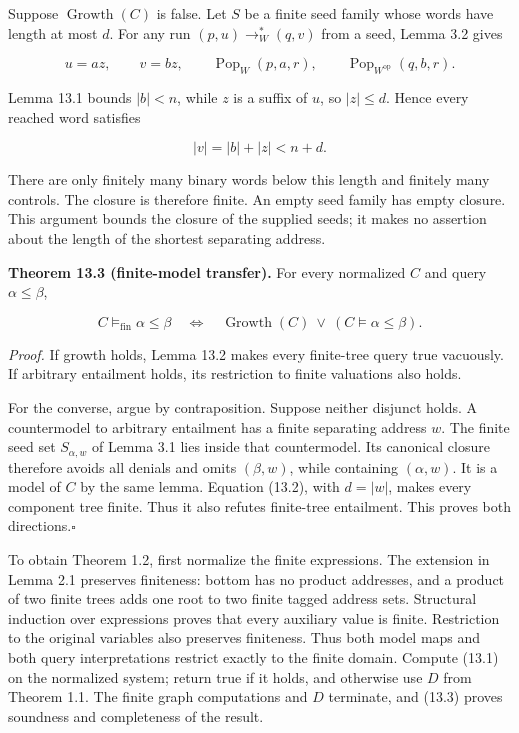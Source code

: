 \documentclass[
  11pt,
  a4paper,
]{article}
\begin{document}
Suppose \(\operatorname{Growth}(C)\) is false. Let \(S\) be a finite
seed family whose words have length at most \(d\). For any run
\((p,u)\to_W^*(q,v)\) from a seed, Lemma 3.2 gives

\[u=az,\qquad v=bz,\qquad
\operatorname{Pop}_W(p,a,r),\qquad
\operatorname{Pop}_{W^{\mathrm{op}}}(q,b,r).\]

Lemma 13.1 bounds \(|b|<n\), while \(z\) is a suffix of \(u\), so
\(|z|\le d\). Hence every reached word satisfies

\[|v|=|b|+|z|<n+d.\tag{13.2}\]

There are only finitely many binary words below this length and finitely
many controls. The closure is therefore finite. An empty seed family has
empty closure. This argument bounds the closure of the supplied seeds;
it makes no assertion about the length of the shortest separating
address.


\textbf{Theorem 13.3 (finite-model transfer).} For every normalized
\(C\) and query \(\alpha\le\beta\),

\[C\models_{\mathrm{fin}}\alpha\le\beta
\quad\Longleftrightarrow\quad
\operatorname{Growth}(C)\ \lor\ (C\models\alpha\le\beta).\tag{13.3}\]

\emph{Proof.} If growth holds, Lemma 13.2 makes every finite-tree query
true vacuously. If arbitrary entailment holds, its restriction to finite
valuations also holds.

For the converse, argue by contraposition. Suppose neither disjunct
holds. A countermodel to arbitrary entailment has a finite separating
address \(w\). The finite seed set \(S_{\alpha,w}\) of Lemma 3.1 lies
inside that countermodel. Its canonical closure therefore avoids all
denials and omits \((\beta,w)\), while containing \((\alpha,w)\). It is
a model of \(C\) by the same lemma. Equation (13.2), with \(d=|w|\),
makes every component tree finite. Thus it also refutes finite-tree
entailment. This proves both directions.\nobreak\hspace{.5em}\(\square\)

To obtain Theorem 1.2, first normalize the finite expressions. The
extension in Lemma 2.1 preserves finiteness: bottom has no product
addresses, and a product of two finite trees adds one root to two finite
tagged address sets. Structural induction over expressions proves that
every auxiliary value is finite. Restriction to the original variables
also preserves finiteness. Thus both model maps and both query
interpretations restrict exactly to the finite domain. Compute (13.1) on
the normalized system; return true if it holds, and otherwise use \(D\)
from Theorem 1.1. The finite graph computations and \(D\) terminate, and
(13.3) proves soundness and completeness of the result.
\end{document}
